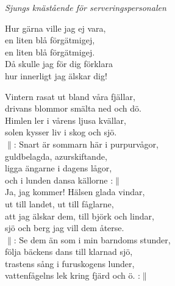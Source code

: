 \documentclass[a6paper, 10pt, twoside]{article}
\begin{document}
\noindent
\begin{center}
\small{\textit{Sjungs knästående för serveringspersonalen}}
\end{center}
\begin{lyrics}
Hur gärna ville jag ej vara,\\
en liten blå förgätmigej,\\
en liten blå förgätmigej.\\
Då skulle jag för dig förklara\\
hur innerligt jag älskar dig!
\end{lyrics}
\vspace{30pt}
\begin{center}
\end{center}
\begin{lyrics}
Vintern rasat ut bland våra fjällar,\\
drivans blommor smälta ned och dö.\\
Himlen ler i vårens ljusa kvällar,\\
solen kysser liv i skog och sjö.
\vspace{5pt}\\
$\|$: Snart är sommarn här i purpurvågor,\\
guldbelagda, azurskiftande,\\
ligga ängarne i dagens lågor,\\
och i lunden dansa källorne :$\|$
\vspace{5pt}\\
Ja, jag kommer! Hälsen glada vindar,\\
ut till landet, ut till fåglarne,\\
att jag älskar dem, till björk och lindar,\\
sjö och berg jag vill dem återse.
\vspace{5pt}\\
$\|$: Se dem än som i min barndoms stunder,\\
följa bäckens dans till klarnad sjö,\\
trastens sång i furuskogens lunder,\\
vattenfågelns lek kring fjärd och ö. :$\|$
\end{lyrics}
\end{document}
